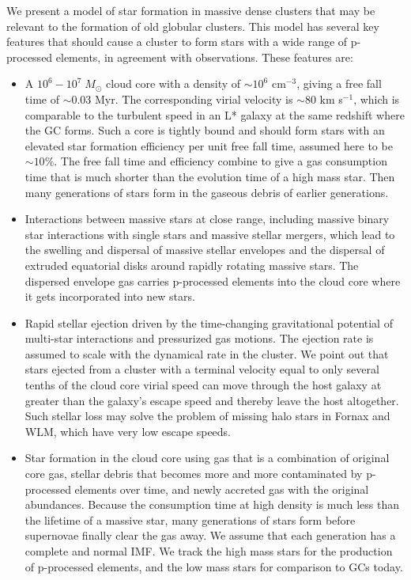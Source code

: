 \documentclass[12pt,preprint]{aastex}
\begin{document}
We present a model of star formation in massive dense clusters that may be relevant
to the formation of old globular clusters. This model has several key features that
should cause a cluster to form stars with a wide range of p-processed elements, in
agreement with observations. These features are:
\begin{itemize}
\item A $10^6-10^7\;M_\odot$ cloud core with a density of $\sim 10^6$
    cm$^{-3}$, giving a free fall time of $\sim0.03$ Myr. The corresponding
    virial velocity is $\sim 80$ km s$^{-1}$, which is comparable to the
    turbulent speed in an L* galaxy at the same redshift where the GC forms.
    Such a core is tightly bound and should form stars with an elevated star
    formation efficiency per unit free fall time, assumed here to be
    $\sim10$\%. The free fall time and efficiency combine to give a gas
    consumption time that is much shorter than the evolution time of a high
    mass star. Then many generations of stars form in the gaseous debris of
    earlier generations.

\item Interactions between massive stars at close range, including massive
    binary star interactions with single stars and massive stellar mergers,
    which lead to the swelling and dispersal of massive stellar envelopes and
    the dispersal of extruded equatorial disks around rapidly rotating massive
    stars. The dispersed envelope gas carries p-processed elements into the
    cloud core where it gets incorporated into new stars.

\item Rapid stellar ejection driven by the time-changing gravitational
    potential of multi-star interactions and pressurized gas motions. The
    ejection rate is assumed to scale with the dynamical rate in the cluster.
    We point out that stars ejected from a cluster with a terminal velocity
    equal to only several tenths of the cloud core virial speed can move
    through the host galaxy at greater than the galaxy's escape speed and
    thereby leave the host altogether. Such stellar loss may solve the problem
    of missing halo stars in Fornax and WLM, which have very low escape speeds.

\item Star formation in the cloud core using gas that is a combination of
    original core gas, stellar debris that becomes more and more contaminated
    by p-processed elements over time, and newly accreted gas with the original
    abundances. Because the consumption time at high density is much less than
    the lifetime of a massive star, many generations of stars form before
    supernovae finally clear the gas away. We assume that each generation has a
    complete and normal IMF. We track the high mass stars for the production of
    p-processed elements, and the low mass stars for comparison to GCs today.
\end{itemize}
\end{document}
